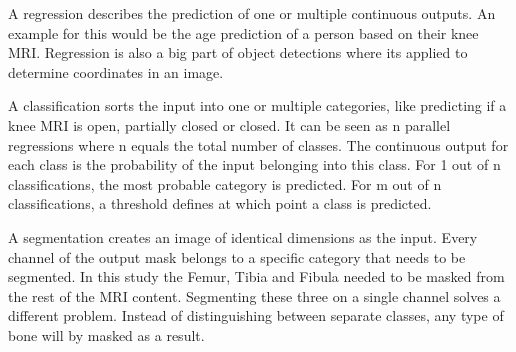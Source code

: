 A regression describes the prediction of one or multiple continuous outputs. An example for this would be the age prediction of a person based on their knee MRI. Regression is also a big part of object detections where its applied to determine coordinates in an image.

A classification sorts the input into one or multiple categories, like predicting if a knee MRI is open, partially closed or closed. It can be seen as n parallel regressions where n equals the total number of classes. The continuous output for each class is the probability of the input belonging into this class. For 1 out of n classifications, the most probable category is predicted. For m out of n classifications, a threshold defines at which point a class is predicted.

A segmentation creates an image of identical dimensions as the input. Every channel of the output mask belongs to a specific category that needs to be segmented. In this study the Femur, Tibia and Fibula needed to be masked from the rest of the MRI content. Segmenting these three on a single channel solves a different problem. Instead of distinguishing between separate classes, any type of bone will by masked as a result.

\newpage